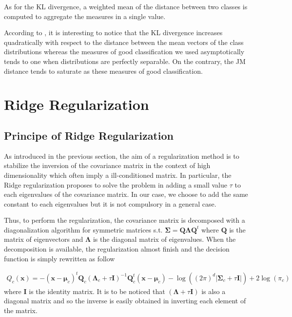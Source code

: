 \documentclass[a4paper,11pt,DIV=16]{scrartcl}
\begin{document}
        As for the KL divergence, a weighted mean of the distance between two classes is computed to aggregate the measures in a single value.

        \vspace{10 mm}

        According to \cite{bruzzone2009novel}, it is interesting to notice that the KL divergence increases quadratically with respect to the distance between the mean vectors of the class distributions whereas the measures of good classification we used asymptotically tends to one when distributions are perfectly separable. On the contrary, the JM distance tends to saturate as these measures of good classification.


\section{Ridge Regularization}
\label{sec:regularization}

    \subsection{Principe of Ridge Regularization}
    As introduced in the previous section, the aim of a regularization method is to stabilize the inversion of the covariance matrix in the context of high dimensionality which often imply a ill-conditioned matrix. In particular, the Ridge regularization proposes to solve the problem in adding a small value $\tau$ to each eigenvalues of the covariance matrix. In our case, we choose to add the same constant to each eigenvalues but it is not compulsory in a general case.

    Thus, to perform the regularization, the covariance matrix is decomposed with a diagonalization algorithm for symmetric matrices s.t. $\boldsymbol{\Sigma} = \mathbf{Q} \boldsymbol{\Lambda} \mathbf{Q}^t$ where $\mathbf{Q}$ is the matrix of eigenvectors and $\boldsymbol{\Lambda}$ is the diagonal matrix of eigenvalues. When the decomposition is available, the regularization almost finish and the decision function is simply rewritten as follow

    \begin{align}
    \label{eq:decision-ridge}
        Q_c(\mathbf{x}) = - (\mathbf{x} - \boldsymbol{\mu}_c)^t \mathbf{Q}_c (\boldsymbol{\Lambda}_c + \tau \mathbf{I})^{-1} \mathbf{Q}_c^t (\mathbf{x} - \boldsymbol{\mu}_c) - \log ((2\pi)^d|\boldsymbol{\Sigma}_c + \tau \mathbf{I}|) + 2 \log (\pi_c)
    \end{align}
    where $\mathbf{I}$ is the identity matrix. It is to be noticed that $(\boldsymbol{\Lambda} + \tau \mathbf{I})$ is also a diagonal matrix and so the inverse is easily obtained in inverting each element of the matrix.
\end{document}
